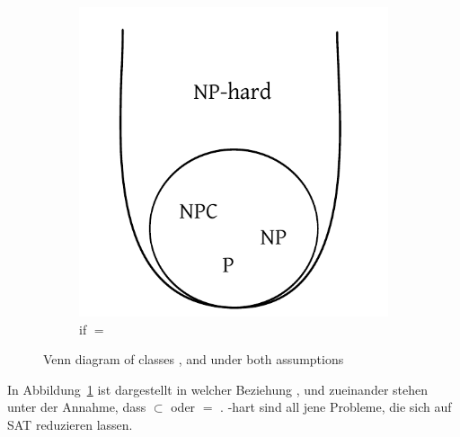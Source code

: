 \begin{figure}
\begin{center}
\begin{subfigure}[b]{0.4\textwidth}
      \includegraphics[width=\textwidth]{img/np_eq_p.pdf}
      \caption{if \cP{} $=$ \cNP{}}
    \end{subfigure}
  \end{center}
  \caption{Venn diagram of classes \cNP{}, \cP{} and \cNPC{} under both assumptions}
  \label{fig:p_np_npc}
\end{figure}

In Abbildung~\ref{fig:p_np_npc} ist dargestellt in welcher Beziehung \cP{}, \cNP{} und \cNP{} zueinander stehen unter der Annahme, dass \cP{} $\subset$ \cNP{} oder \cP{} $=$ \cNP{}. \cNP{}-hart sind all jene Probleme, die sich auf SAT reduzieren lassen.

